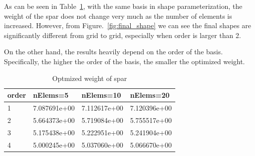 \documentclass[a4paper]{article}
\begin{document}
As can be seen in Table~\ref{tb:weight}, with the same basis in shape parameterization, the weight of the spar does not change very much as the number of elements is increased. However, from Figure.~\ref{fig:final_shape} we can see the final shapes are significantly different from grid to grid, especially when order is larger than 2.

On the other hand, the results heavily depend on the order of the basis. Specifically, the higher the order of the basis, the smaller the optimized weight.
\begin{table}[h]
  \begin{center}
    \caption[]{Optmized weight of spar} \label{tb:weight}
     \begin{tabular}{p{}p{}p{}p{}}
       \hline
       order&      nElems=5  & nElems=10   & nElems=20 \\
        \hline
        1&          7.087691e+00 &  7.112617e+00 &   7.120396e+00  \\
        2&          5.664373e+00 &  5.719084e+00&    5.755517e+00 \\
        3&          5.175438e+00&   5.222951e+00&     5.241904e+00    \\
        4&          5.000245e+00&   5.037060e+00&     5.066670e+00\\
        \hline
     \end{tabular}
  \end{center}
\end{table}
\end{document}
